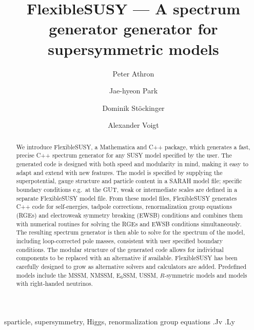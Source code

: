 \documentclass[final,3p,11pt,pdflatex]{elsarticle}
\makeatletter
\newcommand{\sarah}{SARAH\@\xspace}
\newcommand{\fs}{FlexibleSUSY\@\xspace}
\newcommand{\mathematica}{Mathematica\xspace}
\newcommand{\ESSM}{E$_6$SSM\@\xspace}
\makeatother
\begin{document}
\begin{frontmatter}
 \title{\Large\bf FlexibleSUSY --- A spectrum generator generator for supersymmetric models}

\author[adelaide]{Peter Athron}
\author[valencia]{Jae-hyeon Park}
\author[dresden]{Dominik St\"ockinger}
\author[dresden]{Alexander Voigt}
\address[adelaide]{ARC Centre of Excellence for Particle Physics at 
the Tera-scale, School of Chemistry and Physics, University of Adelaide, 
Adelaide SA 5005 Australia}
\address[valencia]{Departament de F\'{i}sica Te\`{o}rica and IFIC,
Universitat de Val\`{e}ncia-CSIC,
46100, Burjassot, Spain}
\address[dresden]{Institut f\"ur Kern- und Teilchenphysik,
TU Dresden, Zellescher Weg 19, 01069 Dresden, Germany}
   
  \begin{abstract}
    We introduce \fs, a \mathematica and C++ package, which generates a fast,
    precise C++ spectrum generator for any SUSY model specified by the
    user.  The generated code is designed with both speed and
    modularity in mind, making it easy to adapt and extend with new
    features. The model is specified by supplying the superpotential,
    gauge structure and particle content in a \sarah model file;
    specific boundary conditions e.g.\ at the GUT, weak or
    intermediate scales are defined in a separate \fs model file.
    From these model files, \fs generates C++ code for self-energies,
    tadpole corrections, renormalization group equations (RGEs) and
    electroweak symmetry breaking (EWSB) conditions and combines them
    with numerical routines for solving the RGEs and EWSB conditions
    simultaneously.  The resulting spectrum generator is then able to
    solve for the spectrum of the model, including loop-corrected pole
    masses, consistent with user specified boundary conditions.  The
    modular structure of the generated code allows for individual
    components to be replaced with an alternative if available. \fs
    has been carefully designed to grow as alternative solvers and
    calculators are added.  Predefined models include the MSSM, NMSSM,
    \ESSM, USSM, $R$-symmetric models and models with right-handed
    neutrinos.
  \end{abstract}

\begin{keyword}
sparticle, 
supersymmetry, 
Higgs,
renormalization group equations
.Jv
.Ly
\end{keyword}
\end{frontmatter}
\end{document}
